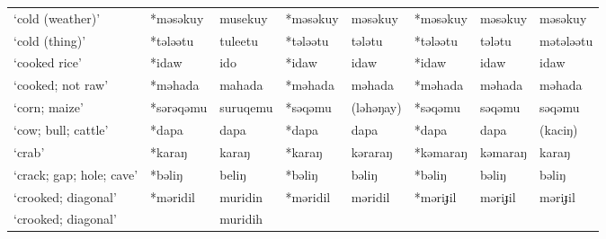 \begin{landscape}
\begin{longtable}[c]{@{}p{3cm}<{\raggedright}p{2.75cm}<{\raggedright}p{2.75cm}<{\raggedright}p{2.75cm}<{\raggedright}p{2.75cm}<{\raggedright}p{2.75cm}<{\raggedright}p{2.75cm}<{\raggedright}p{2.75cm}<{\raggedright}@{}}
`cold (weather)'                                     & *məsəkuy           & musekuy                        & *məsəkuy           & məsəkuy                    & *məsəkuy         & məsəkuy                  & məsəkuy                           \\
`cold (thing)'                                       & *tələətu           & tuleetu                        & *tələətu           & tələtu                     & *tələətu         & tələtu                   & mətələətu                         \\
`cooked rice'                                        & *idaw              & ido                            & *idaw              & idaw                       & *idaw            & idaw                     & idaw                              \\
`cooked; not raw'                                    & *məhada            & mahada                         & *məhada            & məhada                     & *məhada          & məhada                   & məhada                            \\
`corn; maize'                                        & *sərəqəmu          & suruqemu                       & *səqəmu            & (ləhəŋay)                  & *səqəmu          & səqəmu                   & səqəmu                            \\
`cow; bull; cattle'                                  & *dapa              & dapa                           & *dapa              & dapa                       & *dapa            & dapa                     & (kaciŋ)                           \\
`crab'                                               & *karaŋ             & karaŋ                          & *karaŋ             & kəraraŋ                    & *kəmaraŋ         & kəmaraŋ                  & karaŋ                             \\
`crack; gap; hole; cave'                             & *bəliŋ             & beliŋ                          & *bəliŋ             & bəliŋ                      & *bəliŋ           & bəliŋ                    & bəliŋ                             \\
`crooked; diagonal'                                  & *məridil           & muridin                        & *məridil           & məridil                    & *məriɟil         & məriɟil                  & məriɟil                           \\
`crooked; diagonal'                                  &            & muridih                        &                    &                            &                  &                          &                                   \\

\end{longtable}
\end{landscape}
